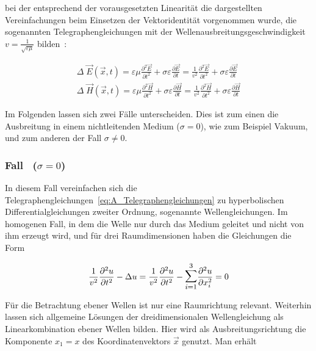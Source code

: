bei der entsprechend der vorausgesetzten Linearität die dargestellten Vereinfachungen beim Einsetzen der Vektoridentität vorgenommen wurde, die sogenannten Telegraphengleichungen mit der Wellenausbreitungsgeschwindigkeit $v = \frac{1}{\sqrt{\varepsilon \mu}}$ bilden~\cite{EM_Schirmung}:

\begin{subequations}
    \label{eq:A_Telegraphengleichungen}
    \begin{align}
        \Delta \; \vec E(\vec x,t) = \varepsilon \mu \frac{\partial ^2 \vec E}{\partial t^2} + \sigma \varepsilon \frac{\partial  \vec E}{\partial t}  = \frac{1}{v^2} \frac{\partial ^2 \vec E}{\partial t^2} + \sigma \varepsilon \frac{\partial  \vec E}{\partial t} \label{subeq:A_Telegraphengleichungen1}\\
        \Delta \; \vec H(\vec x,t) = \varepsilon \mu \frac{\partial ^2 \vec H}{\partial t^2} + \sigma \varepsilon \frac{\partial  \vec H}{\partial t} = \frac{1}{v^2} \frac{\partial ^2 \vec H}{\partial t^2} + \sigma \varepsilon \frac{\partial  \vec H}{\partial t}  \label{subeq:A_Telegraphengleichungen2}
    \end{align}
\end{subequations}

Im Folgenden lassen sich zwei Fälle unterscheiden. Dies ist zum einen die Ausbreitung in einem nichtleitenden Medium ($\sigma = 0$), wie zum Beispiel Vakuum, und zum anderen der Fall $\sigma \neq 0$. 

\subsubsection{Fall~ ($\sigma = 0$)}

In diesem Fall vereinfachen sich die Telegraphengleichungen~\eqref{eq:A_Telegraphengleichungen} zu hyperbolischen Differentialgleichungen zweiter Ordnung, sogenannte Wellengleichungen. Im homogenen Fall, in dem die Welle nur durch das Medium geleitet und nicht von ihm erzeugt wird, und für drei Raumdimensionen haben die Gleichungen die Form

\begin{equation}
     \frac{1}{v^2}\frac{\partial ^2 u}{\partial t^2} - \Delta u = \frac{1}{v^2}\frac{\partial ^2 u}{\partial t^2} -  \mathlarger{\mathlarger{\sum}}_{i=1}^3 \frac{\partial^2 u}{\partial x_i^2} = 0   
\end{equation}

Für die Betrachtung ebener Wellen ist nur eine Raumrichtung relevant. Weiterhin lassen sich allgemeine Lösungen der dreidimensionalen Wellengleichung als Linearkombination ebener Wellen bilden. Hier wird als Ausbreitungsrichtung die Komponente $x_1 = x$ des Koordinatenvektors $\vec x$ genutzt. Man erhält

